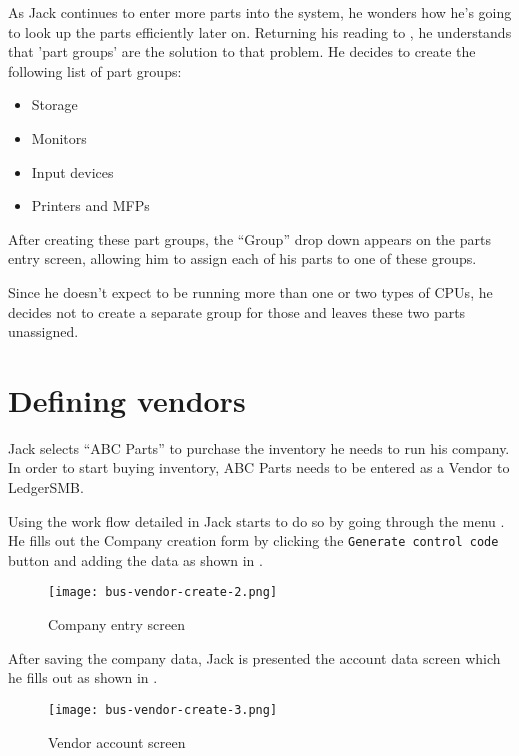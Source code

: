 As Jack continues to enter more parts into the system, he wonders how he's going to
look up the parts efficiently later on. Returning his reading to ,
he understands that 'part groups' are the solution to that problem. He decides to create
the following list of part groups:

\begin{itemize}
\item Storage
\item Monitors
\item Input devices
\item Printers and MFPs
\end{itemize}

After creating these part groups, the ``Group'' drop down appears on the parts entry screen,
allowing him to assign each of his parts to one of these groups.

Since he doesn't expect to be running more than one or two types of CPUs, he decides
not to create a separate group for those and leaves these two parts unassigned.

\section{Defining vendors}
\label{sec-stock-defining-vendors}

Jack selects ``ABC Parts'' to purchase the inventory he needs to run his company. In
order to start buying inventory, ABC Parts needs to be entered as a Vendor to LedgerSMB.

Using the work flow detailed in  Jack starts to do so by going through the menu .
 He fills out the Company creation form by clicking the {\tt Generate control code}
button and adding the data as shown in .

\begin{figure}[h]
\centering
\texttt{[image: bus-vendor-create-2.png]}
\caption{Company entry screen}
\label{fig:vendor-create-1}
\end{figure}

After saving the company data, Jack is presented the account data screen which he fills out
as shown in .

\begin{figure}[h]
\centering
\texttt{[image: bus-vendor-create-3.png]}
\caption{Vendor account screen}
\label{fig:vendor-create-2}
\end{figure}

